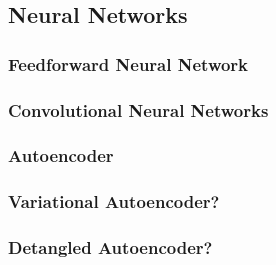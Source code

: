 \documentclass[../main]{subfiles}
\begin{document}
\subsection{Neural Networks}
\subsubsection{Feedforward Neural Network}
\subsubsection{Convolutional Neural Networks}
\subsubsection{Autoencoder}
\subsubsection{Variational Autoencoder?}
\subsubsection{Detangled Autoencoder?}
\end{document}

